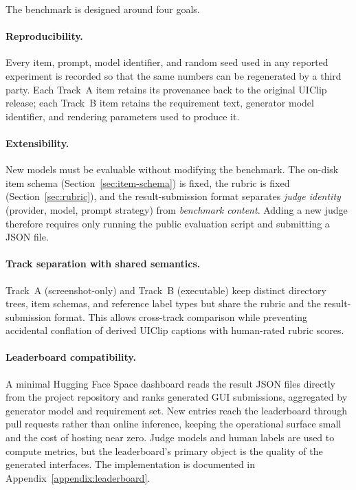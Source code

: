 The benchmark is designed around four goals.

\paragraph{Reproducibility.} Every item, prompt, model identifier, and
random seed used in any reported experiment is recorded so that the same
numbers can be regenerated by a third party. Each Track~A item retains
its provenance back to the original UIClip release; each Track~B item
retains the requirement text, generator model identifier, and rendering
parameters used to produce it.

\paragraph{Extensibility.} New models must be evaluable without
modifying the benchmark. The on-disk item schema
(Section~\ref{sec:item-schema}) is fixed, the rubric is fixed
(Section~\ref{sec:rubric}), and the result-submission format separates
\emph{judge identity} (provider, model, prompt strategy) from
\emph{benchmark content}. Adding a new judge therefore requires only
running the public evaluation script and submitting a JSON file.

\paragraph{Track separation with shared semantics.} Track~A
(screenshot-only) and Track~B (executable) keep distinct directory
trees, item schemas, and reference label types but share the rubric and
the result-submission format. This allows cross-track comparison while
preventing accidental conflation of derived UIClip captions with
human-rated rubric scores.

\paragraph{Leaderboard compatibility.} A minimal Hugging Face Space
dashboard reads the result JSON files directly from the project
repository and ranks generated GUI submissions, aggregated by generator
model and requirement set. New entries reach the leaderboard through
pull requests rather than online inference, keeping the operational
surface small and the cost of hosting near zero. Judge models and human
labels are used to compute metrics, but the leaderboard's primary
object is the quality of the generated interfaces. The implementation
is documented in Appendix~\ref{appendix:leaderboard}.

